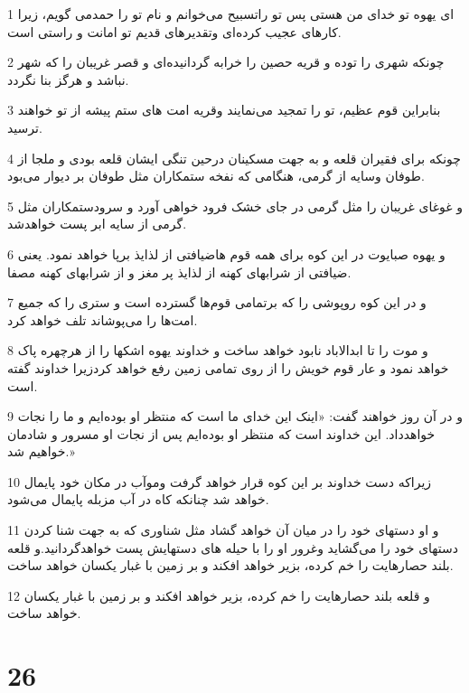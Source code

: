\par 1 ای یهوه تو خدای من هستی پس تو راتسبیح می‌خوانم و نام تو را حمدمی گویم، زیرا کارهای عجیب کرده‌ای وتقدیرهای قدیم تو امانت و راستی است.
\par 2 چونکه شهری را توده و قریه حصین را خرابه گردانیده‌ای و قصر غریبان را که شهر نباشد و هرگز بنا نگردد.
\par 3 بنابراین قوم عظیم، تو را تمجید می‌نمایند وقریه امت های ستم پیشه از تو خواهند ترسید.
\par 4 چونکه برای فقیران قلعه و به جهت مسکینان درحین تنگی ایشان قلعه بودی و ملجا از طوفان وسایه از گرمی، هنگامی که نفخه ستمکاران مثل طوفان بر دیوار می‌بود.
\par 5 و غوغای غریبان را مثل گرمی در جای خشک فرود خواهی آورد و سرودستمکاران مثل گرمی از سایه ابر پست خواهدشد.
\par 6 و یهوه صبایوت در این کوه برای همه قوم هاضیافتی از لذایذ برپا خواهد نمود. یعنی ضیافتی از شرابهای کهنه از لذایذ پر مغز و از شرابهای کهنه مصفا.
\par 7 و در این کوه روپوشی را که برتمامی قوم‌ها گسترده است و ستری را که جمیع امت‌ها را می‌پوشاند تلف خواهد کرد.
\par 8 و موت را تا ابدالاباد نابود خواهد ساخت و خداوند یهوه اشکها را از هر‌چهره پاک خواهد نمود و عار قوم خویش را از روی تمامی زمین رفع خواهد کردزیرا خداوند گفته است.
\par 9 و در آن روز خواهند گفت: «اینک این خدای ما است که منتظر او بوده‌ایم و ما را نجات خواهدداد. این خداوند است که منتظر او بوده‌ایم پس از نجات او مسرور و شادمان خواهیم شد.»
\par 10 زیراکه دست خداوند بر این کوه قرار خواهد گرفت وموآب در مکان خود پایمال خواهد شد چنانکه کاه در آب مزبله پایمال می‌شود.
\par 11 و او دستهای خود را در میان آن خواهد گشاد مثل شناوری که به جهت شنا کردن دستهای خود را می‌گشاید وغرور او را با حیله های دستهایش پست خواهدگردانید.و قلعه بلند حصارهایت را خم کرده، بزیر خواهد افکند و بر زمین با غبار یکسان خواهد ساخت.
\par 12 و قلعه بلند حصارهایت را خم کرده، بزیر خواهد افکند و بر زمین با غبار یکسان خواهد ساخت.
 
\chapter{26}

